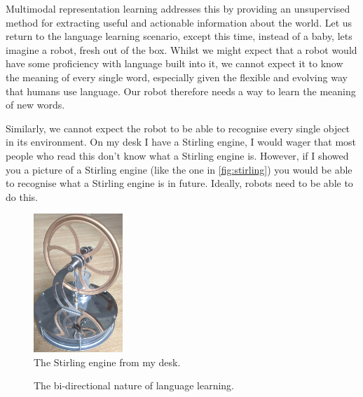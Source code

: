Multimodal representation learning addresses this by providing an unsupervised method for extracting useful and actionable information about the world. Let us return to the language learning scenario, except this time, instead of a baby, lets imagine a robot, fresh out of the box. Whilst we might expect that a robot would have some proficiency with language built into it, we cannot expect it to know the meaning of every single word, especially given the flexible and evolving way that humans use language. Our robot therefore needs a way to learn the meaning of new words. 

Similarly, we cannot expect the robot to be able to recognise every single object in its environment. On my desk I have a Stirling engine, I would wager that most people who read this don't know what a Stirling engine is. However, if I showed you a picture of a Stirling engine (like the one in \autoref{fig:stirling}) you would be able to recognise what a Stirling engine is in future. Ideally, robots need to be able to do this.

\begin{figure}
\centering
	\includegraphics[width=0.3\textwidth]{Figs/introduction/stirling.jpg}
	\caption{The Stirling engine from my desk.}
	\label{fig:stirling}
\end{figure}

\begin{figure}
\centering
{}
\caption{The bi-directional nature of language learning.}
\label{fig:bi_ll}
\end{figure}


